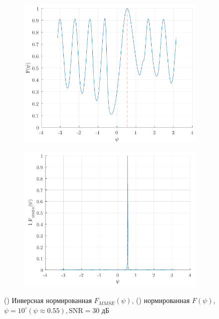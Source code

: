 \begin{figure}[h!]
    \begin{subfigure}{0.49\linewidth}
        \centering
        \includegraphics[width=\linewidth]{figs/fig4.10a}
        \caption{}
        \label{fig:4.10a}
    \end{subfigure}
    \begin{subfigure}{0.49\linewidth}
        \centering
        \includegraphics[width=\linewidth]{figs/fig4.10b}
        \caption{}
        \label{fig:4.10b}
    \end{subfigure}
    \caption{ () Инверсная нормированная $F_{MMSE}(\psi)$,
    () нормированная $F(\psi)$, $\psi=10^\circ(\psi \approx
    0.55), \text{SNR}=30$ дБ}
    \label{fig:4.10}
\end{figure}

